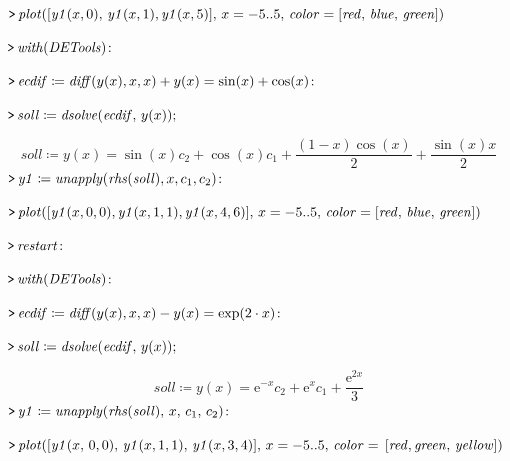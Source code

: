 \documentclass{article}
\begin{document}
\mapleinput
{$ \displaystyle \texttt{>\,} \mathit{plot} ([\mathit{y1} (x ,0),\,\mathit{y1} (x ,1),\mathit{y1} (x ,5)],\,x =-5..5,\,\mathit{color} =[\mathit{red} ,\,\mathit{blue} ,\,\mathit{green}]) $}

{}
\mapleinput
{$ \displaystyle \texttt{>\,} \mathit{with} (\mathit{DETools})\colon  $}

\mapleinput
{$ \displaystyle \texttt{>\,} \mathit{ecdif} \coloneqq \mathit{diff} (y (x),x ,x)+y (x)=\sin (x)+\cos (x)\colon  $}

\mapleinput
{$ \displaystyle \texttt{>\,} \mathit{soll} \coloneqq \mathit{dsolve} (\mathit{ecdif} ,\,y (x)); $}

\begin{dmath}\label{(16)}
\mathit{soll} \coloneqq y \! \left(x \right)=\sin \! \left(x \right) c_{2}+\cos \! \left(x \right) c_{1}+\frac{\left(1-x \right) \cos \! \left(x \right)}{2}+\frac{\sin \! \left(x \right) x}{2}
\end{dmath}
\mapleinput
{$ \displaystyle \texttt{>\,} \mathit{y1} \coloneqq \mathit{unapply} (\mathit{rhs} (\mathit{soll}),x ,c_{1},c_{2})\colon  $}

\mapleinput
{$ \displaystyle \texttt{>\,} \mathit{plot} ([\mathit{y1} (x ,0,0),\mathit{y1} (x ,1,1),\mathit{y1} (x ,4,6)],\,x =-5..5,\,\mathit{color} =[\mathit{red} ,\,\mathit{blue} ,\,\mathit{green}]) $}

{}
\mapleinput
{$ \displaystyle \texttt{>\,} \mathit{restart} \colon  $}

\mapleinput
{$ \displaystyle \texttt{>\,} \mathit{with} (\mathit{DETools})\colon  $}

\mapleinput
{$ \displaystyle \texttt{>\,} \mathit{ecdif} \coloneqq \mathit{diff} (y (x),x ,x)-y (x)=\exp (2\cdot x)\colon  $}

\mapleinput
{$ \displaystyle \texttt{>\,} \mathit{soll} \coloneqq \mathit{dsolve} (\mathit{ecdif} ,\,y (x)); $}

\begin{dmath}\label{(17)}
\mathit{soll} \coloneqq y \! \left(x \right)={\mathrm e}^{-x} c_{2}+{\mathrm e}^{x} c_{1}+\frac{{\mathrm e}^{2 x}}{3}
\end{dmath}
\mapleinput
{$ \displaystyle \texttt{>\,} \mathit{y1} \coloneqq \mathit{unapply} (\mathit{rhs} (\mathit{soll}),\,x ,\,c_{1},\,c_{2})\colon  $}

\mapleinput
{$ \displaystyle \texttt{>\,} \mathit{plot} ([\mathit{y1} (x ,\,0,0),\,\mathit{y1} (x ,1,1),\,\mathit{y1} (x ,3,4)],\,x =-5..5,\,\mathit{color} =\,[\mathit{red} ,\mathit{green} ,\,\mathit{yellow}]) $}
\end{document}
